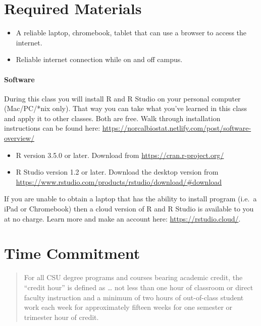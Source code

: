 \documentclass[11pt,]{article}
\providecommand{\tightlist}{%
  \setlength{\itemsep}{0pt}\setlength{\parskip}{0pt}}
\let\oldparagraph\paragraph
\renewcommand{\paragraph}[1]{\oldparagraph{#1}\mbox{}}
\begin{document}
\hypertarget{required-materials}{%
\section{Required Materials}\label{required-materials}}

\begin{itemize}
\tightlist
\item
  A reliable laptop, chromebook, tablet that can use a browser to access
  the internet.
\item
  Reliable internet connection while on and off campus.
\end{itemize}

\hypertarget{software}{%
\paragraph{Software}\label{software}}

During this class you will install R and R Studio on your personal
computer (Mac/PC/*nix only). That way you can take what you've learned
in this class and apply it to other classes. Both are free. Walk through
installation instructions can be found here:
\url{https://norcalbiostat.netlify.com/post/software-overview/}

\begin{itemize}
\tightlist
\item
  R version 3.5.0 or later. Download from
  \url{https://cran.r-project.org/}
\item
  R Studio version 1.2 or later. Download the desktop version from
  \url{https://www.rstudio.com/products/rstudio/download/\#download}
\end{itemize}

If you are unable to obtain a laptop that has the ability to install
program (i.e.~a iPad or Chromebook) then a cloud version of R and R
Studio is available to you at no charge. Learn more and make an account
here: \url{https://rstudio.cloud/}.

\hypertarget{time-commitment}{%
\section{Time Commitment}\label{time-commitment}}

\begin{quote}
For all CSU degree programs and courses bearing academic credit, the
``credit hour'' is defined as \ldots{} not less than one hour of
classroom or direct faculty instruction and a minimum of two hours of
out-of-class student work each week for approximately fifteen weeks for
one semester or trimester hour of credit.
\end{quote}
\end{document}
